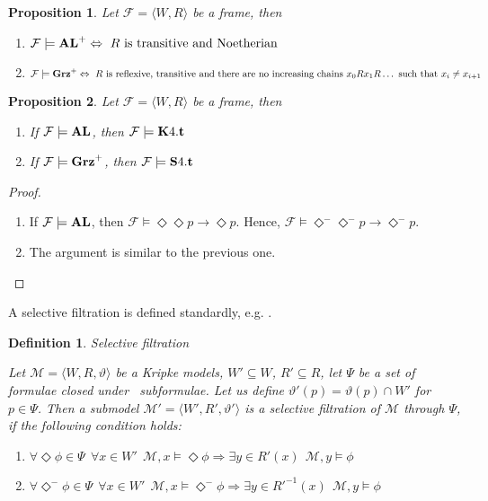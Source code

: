 \documentclass[a4paper]{article}
\theoremstyle{defin}
\newtheorem{defin}{Definition}
\theoremstyle{theorem}
\theoremstyle{prop}
\newtheorem{prop}{Proposition}
\theoremstyle{lemma}
\theoremstyle{ex}
\theoremstyle{col}
\newcommand{\DiamondM}{\Diamond^{-}}
\begin{document}
\begin{prop} Let $\mathcal{F} = \langle W, R \rangle$ be a frame, then

  \begin{enumerate}
    \item $\mathcal{F} \models {\bf AL}^{+} \Leftrightarrow \text{ $R$ is transitive and Noetherian}$
    \item $\mathcal{F} \models {\bf Grz}^{+} \Leftrightarrow \text{ $R$ is reflexive, transitive and there are no increasing chains $x_0 R x_1 R \dots$ such that $x_i \neq x_{i + 1}$}$
  \end{enumerate}
\end{prop}

\begin{prop} Let $\mathcal{F} = \langle W, R \rangle$ be a frame, then

  \begin{enumerate}
  \item If $\mathcal{F} \models {\bf AL}$, then $\mathcal{F} \models {\bf K}4.{\bf t}$
  \item If $\mathcal{F} \models {\bf Grz}^{+}$, then $\mathcal{F} \models {\bf S}4.{\bf t}$
\end{enumerate}
\end{prop}

\begin{proof}
  $ $

  \begin{enumerate}
    \item If $\mathcal{F} \models {\bf AL}$, then $\mathcal{F} \models \Diamond \Diamond p \to \Diamond p$. Hence, $\mathcal{F} \models \DiamondM \DiamondM p \to \DiamondM p$.
    \item The argument is similar to the previous one.
  \end{enumerate}
\end{proof}

A selective filtration is defined standardly, e.g. \cite{ShapirovskyS02}.

\begin{defin} Selective filtration

  Let $\mathcal{M} = \langle W, R, \vartheta \rangle$ be a Kripke models, $W' \subseteq W$, $R' \subseteq R$, let $\Psi$ be a set of formulae closed under \
  subformulae. Let us define $\vartheta'(p) = \vartheta(p) \cap W'$ for $p \in \Psi$. Then a submodel $\mathcal{M}' = \langle W', R', \vartheta' \rangle$ is a
  selective filtration of $\mathcal{M}$ through $\Psi$, if the following condition holds:

  \begin{enumerate}
    \item $\forall \Diamond \phi \in \Psi \:\: \forall x \in W' \:\: \mathcal{M}, x \models \Diamond \phi \Rightarrow \exists y \in R'(x) \:\: \mathcal{M}, y \models \phi$
    \item $\forall \DiamondM \phi \in \Psi \:\: \forall x \in W' \:\: \mathcal{M}, x \models \DiamondM \phi \Rightarrow \exists y \in R'^{-1}(x) \:\: \mathcal{M}, y \models \phi$
  \end{enumerate}
\end{defin}
\end{document}
